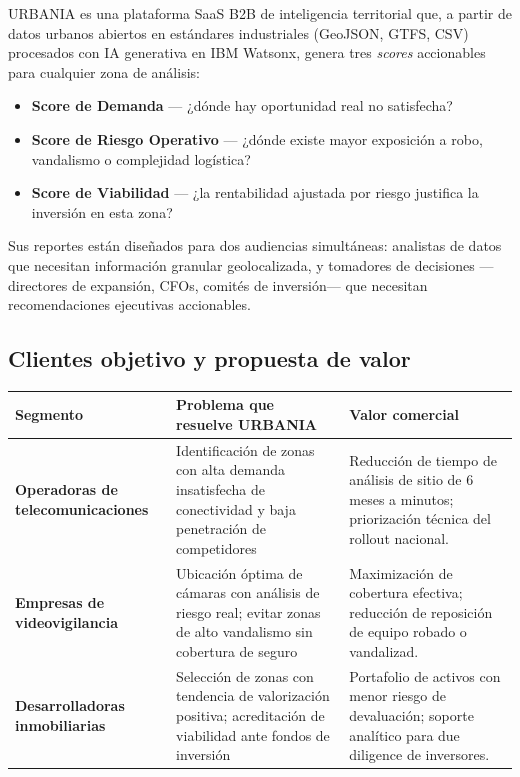 \documentclass[12pt,a4paper]{article}
\begin{document}
URBANIA es una plataforma SaaS B2B de inteligencia territorial que, a partir de datos urbanos abiertos en estándares industriales (GeoJSON, GTFS, CSV) procesados con IA generativa en IBM Watsonx, genera tres \textit{scores} accionables para cualquier zona de análisis:

\begin{itemize}[leftmargin=1.5cm, itemsep=4pt]
  \item \textbf{Score de Demanda} — ¿dónde hay oportunidad real no satisfecha?
  \item \textbf{Score de Riesgo Operativo} — ¿dónde existe mayor exposición a robo, vandalismo o complejidad logística?
  \item \textbf{Score de Viabilidad} — ¿la rentabilidad ajustada por riesgo justifica la inversión en esta zona?
\end{itemize}

Sus reportes están diseñados para dos audiencias simultáneas: analistas de datos que necesitan información granular geolocalizada, y tomadores de decisiones —directores de expansión, CFOs, comités de inversión— que necesitan recomendaciones ejecutivas accionables.

\subsection{Clientes objetivo y propuesta de valor}

\begin{table}[H]
\centering
\small
\renewcommand{\arraystretch}{1.3}
\begin{tabularx}{\textwidth}{>{\bfseries}l X X}
\toprule
\rowcolor{grisoscuro}
\color{white}\textbf{Segmento} & \color{white}\textbf{Problema que resuelve URBANIA} & \color{white}\textbf{Valor comercial} \\
\midrule
Operadoras de telecomunicaciones & Identificación de zonas con alta demanda insatisfecha de conectividad y baja penetración de competidores & Reducción de tiempo de análisis de sitio de 6 meses a minutos; priorización técnica del rollout nacional. \\
\rowcolor{fondofila}
Empresas de videovigilancia & Ubicación óptima de cámaras con análisis de riesgo real; evitar zonas de alto vandalismo sin cobertura de seguro & Maximización de cobertura efectiva; reducción de reposición de equipo robado o vandalizad. \\
Desarrolladoras inmobiliarias & Selección de zonas con tendencia de valorización positiva; acreditación de viabilidad ante fondos de inversión & Portafolio de activos con menor riesgo de devaluación; soporte analítico para due diligence de inversores. \\
\bottomrule
\end{tabularx}
\end{table}
\end{document}
